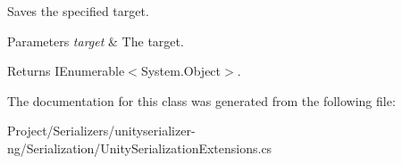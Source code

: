 Saves the specified target. 


\begin{DoxyParams}{Parameters}
{\em target} & The target.\\
\hline
\end{DoxyParams}
\begin{DoxyReturn}{Returns}
I\+Enumerable$<$System.\+Object$>$.
\end{DoxyReturn}


The documentation for this class was generated from the following file\+:\begin{DoxyCompactItemize}
\item 
Project/\+Serializers/unityserializer-\/ng/\+Serialization/Unity\+Serialization\+Extensions.\+cs\end{DoxyCompactItemize}
